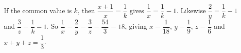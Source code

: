 If the common value is $k$, then $\dfrac{x+1}x=\dfrac1k$ gives $\dfrac1x=\dfrac1k-1$. Likewise $\dfrac2y=\dfrac1k-1$ and $\dfrac3z=\dfrac1k-1$. So $\dfrac1x=\dfrac2y=\dfrac3z=\dfrac{54}3=18$, giving $x=\dfrac1{18}$, $y=\dfrac19$, $z=\dfrac16$ and $x+y+z=\boxed{\dfrac13}$.
